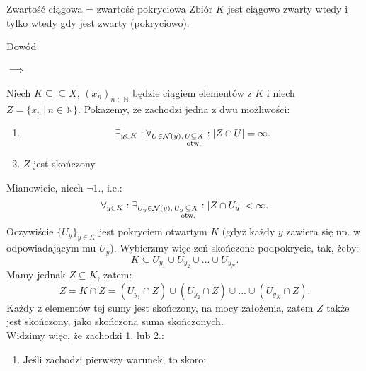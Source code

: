 \documentclass{article}
\numberwithin{defi}{section}
\numberwithin{theo}{section}
\numberwithin{defi}{section}
\newcommand{\N}{\mathbb{N}}
\newcommand{\oo}{\infty}
\newcommand{\Nau}{\mathcal{N}}
\newcommand{\subotw}{\underset{\clap{\scriptsize otw.}}{\subseteq}}
\newcommand{\ciag}[1]{(#1_{n})_{n \in \N}}
\begin{document}
    \begin{twier}{Zwartość ciągowa = zwartość pokryciowa}
        Zbiór $K$ jest ciągowo zwarty wtedy i tylko wtedy gdy jest zwarty (pokryciowo).
    \end{twier}






    \begin{dow}{Dowód}
        \paragraph{$\implies$} Niech $K \subseteq \subseteq X$, $\ciag{x}$ będzie ciągiem elementów z $K$ i niech $Z  = \{ x_n \, | \, n \in \N \}$. Pokażemy, że zachodzi jedna z dwu możliwości: \begin{enumerate}
            \item \begin{equation*}
                \exists_{y \in K}: \forall_{U \in \Nau(y), \, U \subotw X}: | Z \cap U | = \oo. 
            \end{equation*}
            \item $Z$ jest skończony.
        \end{enumerate}  
        Mianowicie, niech $\neg 1.$, i.e.: \begin{equation*}
            \forall_{y \in K}: \exists_{U_y \in \Nau(y), \, U_y \, \subotw X}: | Z \cap U_y | < \oo.
        \end{equation*} Oczywiście $\{ U_y \}_{y \in K}$ jest pokryciem otwartym $K$ (gdyż każdy $y$ zawiera się np. w odpowiadającym mu $U_y$). Wybierzmy więc zeń skończone podpokrycie, tak, żeby: \begin{equation*}
            K \subseteq U_{y_1} \cup U_{y_2} \cup ... \cup U_{y_N}. 
        \end{equation*} Mamy jednak $Z \subseteq K$, zatem: \begin{equation}
            Z = K \cap Z = (U_{y_1} \cap Z) \cup (U_{y_2} \cap Z) \cup ... \cup (U_{y_N} \cap Z).
        \end{equation} Każdy z elementów tej sumy jest skończony, na mocy założenia, zatem $Z$ także jest skończony, jako skończona suma skończonych. \\
        Widzimy więc, że zachodzi 1. lub 2.: \begin{enumerate}
            \item Jeśli zachodzi pierwszy warunek, to skoro: \begin{equation*}

\end{equation*}
\end{enumerate}
\end{dow}
\end{document}
